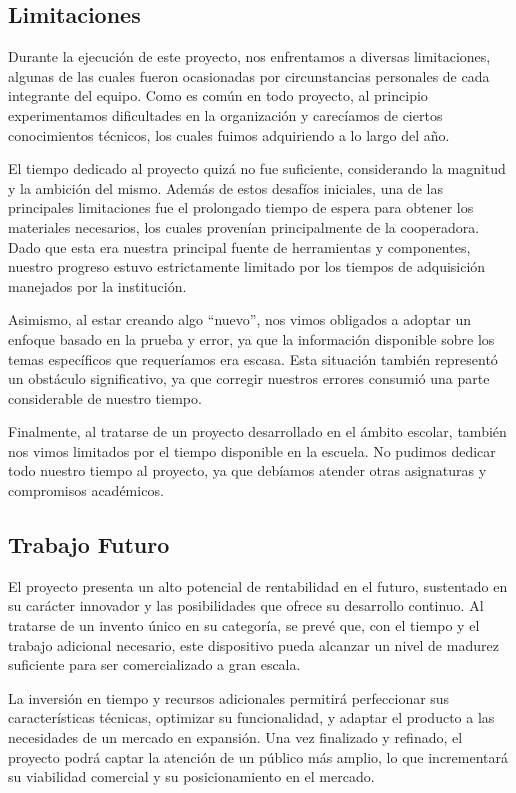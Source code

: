 \documentclass{article}
\begin{document}
\subsection{Limitaciones}
Durante la ejecución de este proyecto, nos enfrentamos a diversas limitaciones, algunas de las cuales fueron ocasionadas por circunstancias personales de cada integrante del equipo. Como es común en todo proyecto, al principio experimentamos dificultades en la organización y carecíamos de ciertos conocimientos técnicos, los cuales fuimos adquiriendo a lo largo del año.



El tiempo dedicado al proyecto quizá no fue suficiente, considerando la magnitud y la ambición del mismo. Además de estos desafíos iniciales, una de las principales limitaciones fue el prolongado tiempo de espera para obtener los materiales necesarios, los cuales provenían principalmente de la cooperadora. Dado que esta era nuestra principal fuente de herramientas y componentes, nuestro progreso estuvo estrictamente limitado por los tiempos de adquisición manejados por la institución.


Asimismo, al estar creando algo “nuevo”, nos vimos obligados a adoptar un enfoque basado en la prueba y error, ya que la información disponible sobre los temas específicos que requeríamos era escasa. Esta situación también representó un obstáculo significativo, ya que corregir nuestros errores consumió una parte considerable de nuestro tiempo.


Finalmente, al tratarse de un proyecto desarrollado en el ámbito escolar, también nos vimos limitados por el tiempo disponible en la escuela. No pudimos dedicar todo nuestro tiempo al proyecto, ya que debíamos atender otras asignaturas y compromisos académicos.

\subsection{Trabajo Futuro}
El proyecto presenta un alto potencial de rentabilidad en el futuro, sustentado en su carácter innovador y las posibilidades que ofrece su desarrollo continuo. Al tratarse de un invento único en su categoría, se prevé que, con el tiempo y el trabajo adicional necesario, este dispositivo pueda alcanzar un nivel de madurez suficiente para ser comercializado a gran escala.

La inversión en tiempo y recursos adicionales permitirá perfeccionar sus características técnicas, optimizar su funcionalidad, y adaptar el producto a las necesidades de un mercado en expansión. Una vez finalizado y refinado, el proyecto podrá captar la atención de un público más amplio, lo que incrementará su viabilidad comercial y su posicionamiento en el mercado.
\end{document}
